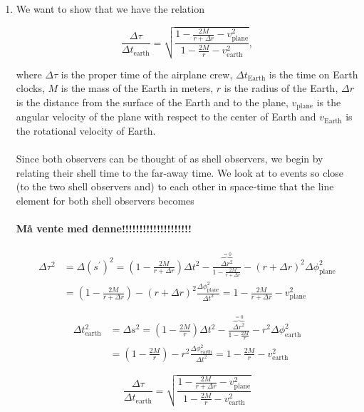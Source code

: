 \documentclass[a4paper,10pt,english]{article}
\begin{document}
\begin{enumerate}

\item We want to show that we have the relation 

\[\frac{\Delta\tau}{\Delta t_{\text{earth}}}=\sqrt{\frac{1-\frac{2M}{r+\Delta r}-v_{\text{plane}}^{2}}{1-\frac{2M}{r}-v_{\text{earth}}^{2}}},\]

where $\Delta\tau$ is the proper time of the airplane crew, $\Delta t_{\text{Earth}}$ is the time on Earth clocks, $M$ is the mass of the Earth in meters, $r$ is the radius of the Earth, $\Delta r$ is the distance from the surface of the Earth and to the plane, $v_{\text{plane}}$ is the angular velocity of the plane with respect to the center of Earth and $v_{\text{Earth}}$ is the rotational velocity of Earth.
\\
\\
Since both observers can be thought of as shell observers, we begin by relating their shell time to the far-away time. We look at to events so close (to the two shell observers and) to each other in space-time that the line element for both shell observers becomes
\\ \\ 
\textbf{Må vente med denne!!!!!!!!!!!!!!!!!!!!}
\\ \\
\begin{align*}
\Delta\tau^{2}&=\Delta (s^{\prime})^{2}=\left(1-\frac{2M}{r+\Delta r}\right)\Delta t^{2}-\frac{\overbrace{\Delta r^{2}}^{=0}}{1-\frac{2M}{r+\Delta r}}-(r+\Delta r)^{2}\Delta\phi^{2}_{\text{plane}}\\
&=\left(1-\frac{2M}{r+\Delta r}\right)-(r+\Delta r)^{2}\frac{\Delta\phi^{2}_{\text{plane}}}{\Delta t^{2}}=1-\frac{2M}{r+\Delta r}-v_{\text{plane}}^{2}
\end{align*}

\begin{align*}
\Delta t_{\text{earth}}^{2}&=\Delta s^{2}=\left(1-\frac{2M}{r}\right)\Delta t^{2}-\frac{\overbrace{\Delta r^{2}}^{=0}}{1-\frac{2M}{r}}-r^{2}\Delta\phi^{2}_{\text{earth}}\\
&=\left(1-\frac{2M}{r}\right)-r^{2}\frac{\Delta\phi^{2}_{\text{earth}}}{\Delta t^{2}}=1-\frac{2M}{r}-v_{\text{earth}}^{2}
\end{align*}

\begin{equation*}
\frac{\Delta\tau}{\Delta t_{\text{earth}}}=\sqrt{\frac{1-\frac{2M}{r+\Delta r}-v_{\text{plane}}^{2}}{1-\frac{2M}{r}-v_{\text{earth}}^{2}}}
\end{equation*}


\end{enumerate}
\end{document}

